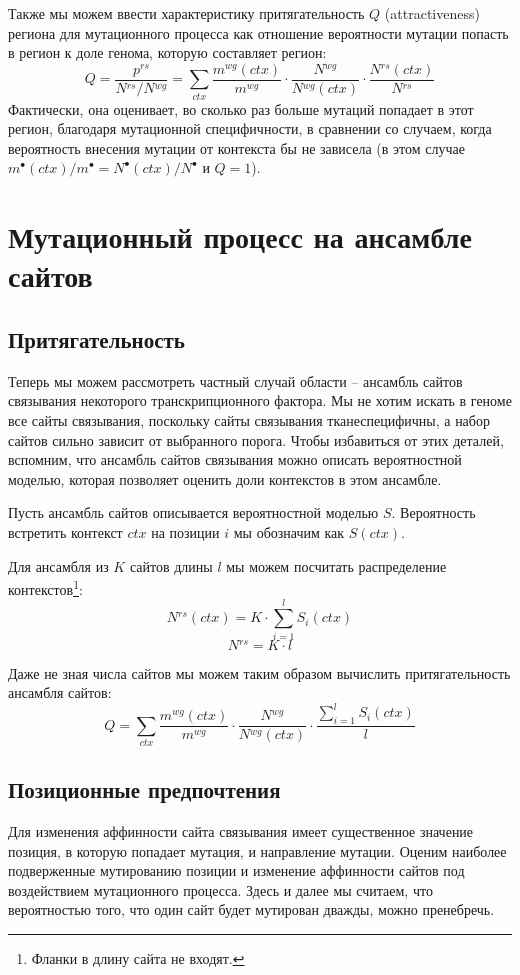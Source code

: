 \documentclass[a4paper]{article}
\newcommand\wg{{}^{wg}}
\newcommand\rs{{}^{rs}}
\newcommand\sumctx{\sum_{ctx}}
\begin{document}
Также мы можем ввести характеристику притягательность $Q$ (attractiveness) региона для мутационного процесса как отношение вероятности мутации попасть в регион к доле генома, которую составляет регион:
\begin{equation}
	Q = \frac{p\rs}{N\rs / N\wg} = \sumctx \frac{m\wg(ctx)}{m\wg} \cdot \frac{N\wg}{N\wg(ctx)} \cdot \frac{N\rs(ctx)} {N\rs}
\end{equation}
Фактически, она оценивает, во сколько раз больше мутаций попадает в этот регион, благодаря мутационной специфичности, в сравнении со случаем, когда вероятность внесения мутации от контекста бы не зависела (в этом случае $m^{\bullet}(ctx)/m^{\bullet} = N^{\bullet}(ctx)/N^{\bullet}$ и $Q=1$).


\section*{Мутационный процесс на ансамбле сайтов}
\subsection*{Притягательность}
Теперь мы можем рассмотреть частный случай области -- ансамбль сайтов связывания некоторого транскрипционного фактора. Мы не хотим искать в геноме все сайты связывания, поскольку сайты связывания тканеспецифичны, а набор сайтов сильно зависит от выбранного порога. Чтобы избавиться от этих деталей, вспомним, что ансамбль сайтов связывания можно описать вероятностной моделью, которая позволяет оценить доли контекстов в этом ансамбле.

Пусть ансамбль сайтов описывается вероятностной моделью $S$. Вероятность встретить контекст $ctx$ на позиции $i$ мы обозначим как $S(ctx)$.

Для ансамбля из $K$ сайтов длины $l$ мы можем посчитать распределение контекстов\footnote{Фланки в длину сайта не входят.}:
$$N\rs(ctx) = K\cdot\sum_{i=1}^l S_i(ctx)$$
$$N\rs=K\cdot l$$

Даже не зная числа сайтов мы можем таким образом вычислить притягательность ансамбля сайтов:
\begin{equation}\label{motif-attractiveness}
Q = \sumctx \frac{m\wg(ctx)}{m\wg} \cdot \frac{N\wg}{N\wg(ctx)} \cdot \frac{\sum_{i=1}^l S_i(ctx)}{l}
\end{equation}

\subsection*{Позиционные предпочтения}
Для изменения аффинности сайта связывания имеет существенное значение позиция, в которую попадает мутация, и направление мутации. Оценим наиболее подверженные мутированию позиции и изменение аффинности сайтов под воздействием мутационного процесса. Здесь и далее мы считаем, что вероятностью того, что один сайт будет мутирован дважды, можно пренебречь.
\end{document}
